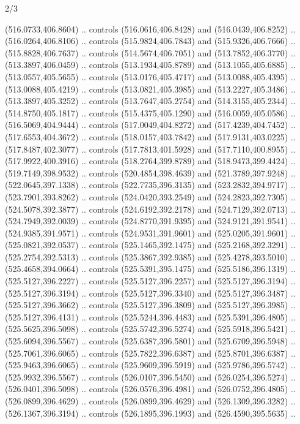 \begin{flagdescription}{2/3}
\begin{scope}[xshift=0.5\flaglength,yshift=0.5\flagwidth,scale=\flagwidth/495.65]
\begin{scope}[y=0.8pt, x=0.8pt, yscale=-1,shift={(-463.76,-309.78)}]
  (516.0733,406.8604) .. controls (516.0616,406.8428) and (516.0439,406.8252) ..
  (516.0264,406.8106) .. controls (515.9824,406.7843) and (515.9326,406.7666) ..
  (515.8828,406.7637) .. controls (514.5674,406.7051) and (513.7852,406.3770) ..
  (513.3897,406.0459) .. controls (513.1934,405.8789) and (513.1055,405.6885) ..
  (513.0557,405.5655) .. controls (513.0176,405.4717) and (513.0088,405.4395) ..
  (513.0088,405.4219) .. controls (513.0821,405.3985) and (513.2227,405.3486) ..
  (513.3897,405.3252) .. controls (513.7647,405.2754) and (514.3155,405.2344) ..
  (514.8750,405.1817) .. controls (515.4375,405.1290) and (516.0059,405.0586) ..
  (516.5069,404.9444) .. controls (517.0049,404.8272) and (517.4239,404.7452) ..
  (517.6553,404.3672) .. controls (518.0157,403.7842) and (517.9131,403.0225) ..
  (517.8487,402.3077) .. controls (517.7813,401.5928) and (517.7110,400.8955) ..
  (517.9922,400.3916) .. controls (518.2764,399.8789) and (518.9473,399.4424) ..
  (519.7149,398.9532) .. controls (520.4854,398.4639) and (521.3789,397.9248) ..
  (522.0645,397.1338) .. controls (522.7735,396.3135) and (523.2832,394.9717) ..
  (523.7901,393.8262) .. controls (524.0420,393.2549) and (524.2823,392.7305) ..
  (524.5078,392.3877) .. controls (524.6192,392.2178) and (524.7129,392.0713) ..
  (524.7949,392.0039) .. controls (524.8770,391.9395) and (524.9121,391.9541) ..
  (524.9385,391.9571) .. controls (524.9531,391.9601) and (525.0205,391.9601) ..
  (525.0821,392.0537) .. controls (525.1465,392.1475) and (525.2168,392.3291) ..
  (525.2754,392.5313) .. controls (525.3867,392.9385) and (525.4278,393.5010) ..
  (525.4658,394.0664) .. controls (525.5391,395.1475) and (525.5186,396.1319) ..
  (525.5127,396.2227) .. controls (525.5127,396.2257) and (525.5127,396.3194) ..
  (525.5127,396.3194) .. controls (525.5127,396.3340) and (525.5127,396.3487) ..
  (525.5127,396.3662) .. controls (525.5127,396.3809) and (525.5127,396.3985) ..
  (525.5127,396.4131) .. controls (525.5244,396.4483) and (525.5391,396.4805) ..
  (525.5625,396.5098) .. controls (525.5742,396.5274) and (525.5918,396.5421) ..
  (525.6094,396.5567) .. controls (525.6387,396.5801) and (525.6709,396.5948) ..
  (525.7061,396.6065) .. controls (525.7822,396.6387) and (525.8701,396.6387) ..
  (525.9463,396.6065) .. controls (525.9609,396.5919) and (525.9786,396.5742) ..
  (525.9932,396.5567) .. controls (526.0107,396.5450) and (526.0254,396.5274) ..
  (526.0401,396.5098) .. controls (526.0576,396.4981) and (526.0752,396.4805) ..
  (526.0899,396.4629) .. controls (526.0899,396.4629) and (526.1309,396.3282) ..
  (526.1367,396.3194) .. controls (526.1895,396.1993) and (526.4590,395.5635) ..

\end{scope}
\end{scope}
\end{flagdescription}
